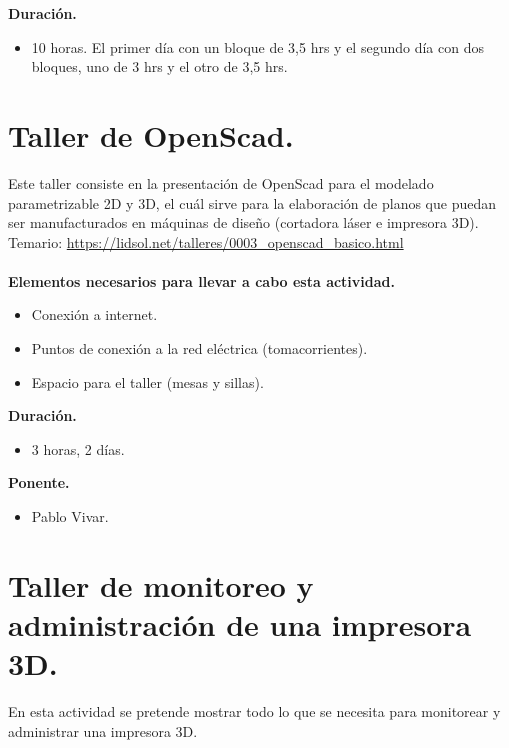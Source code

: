 \documentclass[a4paper,11pt]{article}                 %
\begin{document}
  \textbf{Duración.}
  \begin{itemize}
    \item 10 horas. El primer día con un bloque de 3,5 hrs y el segundo día con dos bloques, uno de 3 hrs y el otro de 3,5 hrs.
  \end{itemize}
  
      \section{Taller de OpenScad.}                                     %

  Este taller consiste en la presentación de OpenScad para el modelado parametrizable 2D y 3D, el cuál sirve para la elaboración de planos que puedan ser manufacturados en máquinas de diseño (cortadora láser e impresora 3D).
  Temario: \url{https://lidsol.net/talleres/0003_openscad_basico.html}
      \paragraph{}
  \textbf{Elementos necesarios para llevar a cabo esta actividad.}
  \begin{itemize}
    \label{list:openscad}
    \item Conexión a internet.
    \item Puntos de conexión a la red eléctrica (tomacorrientes).
    \item Espacio para el taller (mesas y sillas).
  \end{itemize}
  
  \textbf{Duración.}
  \begin{itemize}
    \item 3 horas, 2 días.
  \end{itemize}
  
            \textbf{Ponente.}
  \begin{itemize}
    \item Pablo Vivar.
  \end{itemize}
  
  
  \section{Taller de monitoreo y administración de una impresora 3D.}                                     %

   En esta actividad se pretende mostrar todo lo que se necesita para monitorear y administrar una impresora 3D.
\end{document}
